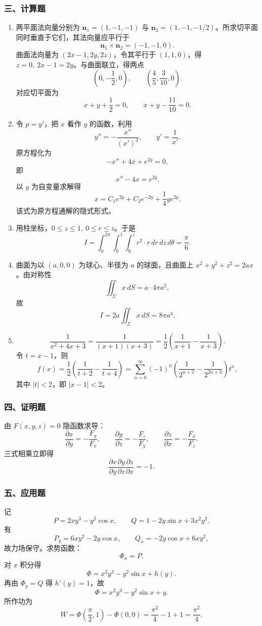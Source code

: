 \subsubsection*{三、计算题}
\begin{enumerate}
  \item 两平面法向量分别为 $\mathbf n_1=(1,-1,-1)$ 与 $\mathbf n_2=(1,-1,-1/2)$。所求切平面同时垂直于它们，其法向量应平行于
  \[
  \mathbf n_1\times\mathbf n_2=(-1,-1,0).
  \]
  曲面法向量为 $(2x-1,2y,2z)$，令其平行于 $(1,1,0)$，得 $z=0,\ 2x-1=2y$。与曲面联立，得两点
  \[
  \left(0,-\frac12,0\right),\qquad \left(\frac45,\frac3{10},0\right).
  \]
  对应切平面为
  \[
  x+y+\frac12=0,\qquad x+y-\frac{11}{10}=0.
  \]
  \item 令 $p=y'$，把 $x$ 看作 $y$ 的函数，利用
  \[
  y''=-\frac{x''}{(x')^3},\qquad y'=\frac1{x'}.
  \]
  原方程化为
  \[
  -x''+4x+e^{2y}=0,
  \]
  即
  \[
  x''-4x=e^{2y}.
  \]
  以 $y$ 为自变量求解得
  \[
  x=C_1e^{2y}+C_2e^{-2y}+\frac14 y e^{2y}.
  \]
  该式为原方程通解的隐式形式。
  \item 用柱坐标，$0\le z\le1,\ 0\le r\le z$。于是
  \[
  I=\int_0^{2\pi}\int_0^1\int_0^z r^2\cdot r\,dr\,dz\,d\theta
  =\frac{\pi}{6}.
  \]
  \item 曲面为以 $(a,0,0)$ 为球心、半径为 $a$ 的球面，且曲面上 $x^2+y^2+z^2=2ax$。由对称性
  \[
  \iint_\Sigma x\,dS=a\cdot4\pi a^2,
  \]
  故
  \[
  I=2a\iint_\Sigma x\,dS=8\pi a^4.
  \]
  \item
  \[
  \frac1{x^2+4x+3}=\frac1{(x+1)(x+3)}
  =\frac12\left(\frac1{x+1}-\frac1{x+3}\right).
  \]
  令 $t=x-1$，则
  \[
  f(x)=\frac12\left(\frac1{t+2}-\frac1{t+4}\right)
  =\sum_{n=0}^{\infty}(-1)^n\left(\frac1{2^{n+2}}-\frac1{2^{2n+3}}\right)t^n,
  \]
  其中 $|t|<2$，即 $|x-1|<2$。
\end{enumerate}

\subsubsection*{四、证明题}
由 $F(x,y,z)=0$ 隐函数求导：
\[
\frac{\partial x}{\partial y}=-\frac{F_y}{F_x},\qquad
\frac{\partial y}{\partial z}=-\frac{F_z}{F_y},\qquad
\frac{\partial z}{\partial x}=-\frac{F_x}{F_z}.
\]
三式相乘立即得
\[
\frac{\partial x}{\partial y}\frac{\partial y}{\partial z}\frac{\partial z}{\partial x}=-1.
\]

\subsubsection*{五、应用题}
记
\[
P=2xy^3-y^2\cos x,\qquad Q=1-2y\sin x+3x^2y^2.
\]
有
\[
P_y=6xy^2-2y\cos x,\qquad Q_x=-2y\cos x+6xy^2,
\]
故力场保守。求势函数：
\[
\Phi_x=P.
\]
对 $x$ 积分得
\[
\Phi=x^2y^3-y^2\sin x+h(y).
\]
再由 $\Phi_y=Q$ 得 $h'(y)=1$，故
\[
\Phi=x^2y^3-y^2\sin x+y.
\]
所作功为
\[
W=\Phi\!\left(\frac\pi2,1\right)-\Phi(0,0)
=\frac{\pi^2}{4}-1+1=\frac{\pi^2}{4}.
\]
